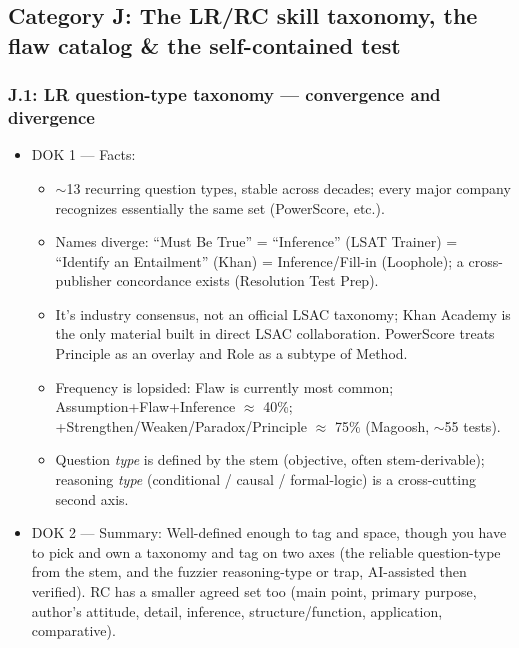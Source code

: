 \documentclass[11pt]{article}
\begin{document}
\subsection*{Category J: The LR/RC skill taxonomy, the flaw catalog \& the self-contained test}
\subsubsection*{J.1: LR question-type taxonomy --- convergence and divergence}
\begin{itemize}
\item DOK 1 --- Facts:
\begin{itemize}
\item $\sim$13 recurring question types, stable across decades; every major company recognizes essentially the same set (PowerScore, etc.).
\item Names diverge: \enquote{Must Be True} = \enquote{Inference} (LSAT Trainer) = \enquote{Identify an Entailment} (Khan) = Inference/Fill-in (Loophole); a cross-publisher concordance exists (Resolution Test Prep).
\item It's industry consensus, not an official LSAC taxonomy; Khan Academy is the only material built in direct LSAC collaboration. PowerScore treats Principle as an overlay and Role as a subtype of Method.
\item Frequency is lopsided: Flaw is currently most common; Assumption+Flaw+Inference $\approx$ 40\%; +Strengthen/Weaken/Paradox/Principle $\approx$ 75\% (Magoosh, $\sim$55 tests).
\item Question \textit{type} is defined by the stem (objective, often stem-derivable); reasoning \textit{type} (conditional / causal / formal-logic) is a cross-cutting second axis.
\end{itemize}
\item DOK 2 --- Summary: Well-defined enough to tag and space, though you have to pick and own a taxonomy and tag on two axes (the reliable question-type from the stem, and the fuzzier reasoning-type or trap, AI-assisted then verified). RC has a smaller agreed set too (main point, primary purpose, author's attitude, detail, inference, structure/function, application, comparative).
\end{itemize}
\end{document}
